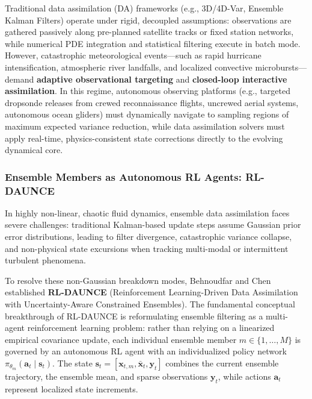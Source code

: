 Traditional data assimilation (DA) frameworks (e.g., 3D/4D-Var, Ensemble Kalman Filters) operate under rigid, decoupled assumptions: observations are gathered passively along pre-planned satellite tracks or fixed station networks, while numerical PDE integration and statistical filtering execute in batch mode. However, catastrophic meteorological events---such as rapid hurricane intensification, atmospheric river landfalls, and localized convective microbursts---demand \textbf{adaptive observational targeting} and \textbf{closed-loop interactive assimilation}. In this regime, autonomous observing platforms (e.g., targeted dropsonde releases from crewed reconnaissance flights, uncrewed aerial systems, autonomous ocean gliders) must dynamically navigate to sampling regions of maximum expected variance reduction, while data assimilation solvers must apply real-time, physics-consistent state corrections directly to the evolving dynamical core.

\subsubsection{Ensemble Members as Autonomous RL Agents: RL-DAUNCE}
In highly non-linear, chaotic fluid dynamics, ensemble data assimilation faces severe challenges: traditional Kalman-based update steps assume Gaussian prior error distributions, leading to filter divergence, catastrophic variance collapse, and non-physical state excursions when tracking multi-modal or intermittent turbulent phenomena. 

To resolve these non-Gaussian breakdown modes, Behnoudfar and Chen~\cite{behnoudfar2025rldaunce} established \textbf{RL-DAUNCE} (Reinforcement Learning-Driven Data Assimilation with Uncertainty-Aware Constrained Ensembles). The fundamental conceptual breakthrough of RL-DAUNCE is reformulating ensemble filtering as a multi-agent reinforcement learning problem: rather than relying on a linearized empirical covariance update, each individual ensemble member $m \in \{1, \dots, M\}$ is governed by an autonomous RL agent with an individualized policy network $\pi_{\theta_m}(\mathbf{a}_t \mid \mathbf{s}_t)$. The state $\mathbf{s}_t = [\mathbf{x}_{t, m}, \bar{\mathbf{x}}_t, \mathbf{y}_t]$ combines the current ensemble trajectory, the ensemble mean, and sparse observations $\mathbf{y}_t$, while actions $\mathbf{a}_t$ represent localized state increments.

